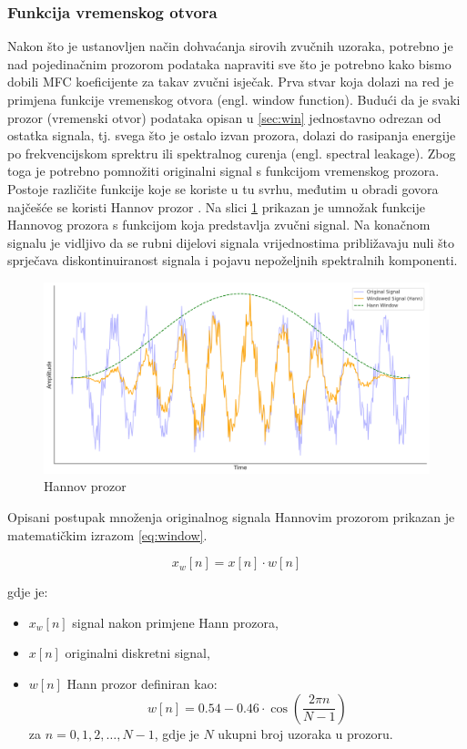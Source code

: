 \subsubsection{Funkcija vremenskog otvora}
Nakon što je ustanovljen način dohvaćanja sirovih zvučnih uzoraka, potrebno je
nad pojedinačnim prozorom podataka napraviti sve što je potrebno kako bismo
dobili MFC koeficijente za takav zvučni isječak. Prva stvar koja dolazi na red 
je primjena funkcije vremenskog otvora (engl. window function). Budući da je svaki
prozor (vremenski otvor) podataka opisan u \ref{sec:win} jednostavno odrezan od ostatka
signala, tj. svega što je ostalo izvan prozora, dolazi do rasipanja energije po
frekvencijskom sprektru ili spektralnog curenja (engl. spectral leakage). 
Zbog toga je potrebno pomnožiti originalni signal s funkcijom vremenskog prozora. Postoje
različite funkcije koje se koriste u tu svrhu, međutim u obradi govora najčešće se koristi
Hannov prozor \cite{windowing}.
Na slici \ref{pic:hann} prikazan je umnožak funkcije Hannovog prozora s funkcijom
koja predstavlja zvučni signal. Na konačnom signalu je vidljivo da se rubni dijelovi
signala vrijednostima približavaju nuli što sprječava diskontinuiranost signala i pojavu 
nepoželjnih spektralnih komponenti.

\begin{figure}[htb]
    \centering
    \includegraphics[width=0.8\linewidth]{Chapters/struktura_sustava/generiranje_znacajki/hann.png} 
    \caption{Hannov prozor}
    \label{pic:hann}
\end{figure}

Opisani postupak množenja originalnog signala Hannovim prozorom prikazan je 
matematičkim izrazom \ref{eq:window}.

\begin{equation}
    x_w[n] = x[n] \cdot w[n]
    \label{eq:window}
\end{equation}

gdje je:
\begin{itemize}
    \item \( x_w[n] \) signal nakon primjene Hann prozora,
    \item \( x[n] \) originalni diskretni signal,
    \item \( w[n] \) Hann prozor definiran kao:
    \begin{equation}
        w[n] = 0.54 - 0.46 \cdot \cos\left( \frac{2 \pi n}{N-1} \right)
    \end{equation}
    za \( n = 0, 1, 2, \dots, N-1 \),
    gdje je \( N \) ukupni broj uzoraka u prozoru.
\end{itemize}

